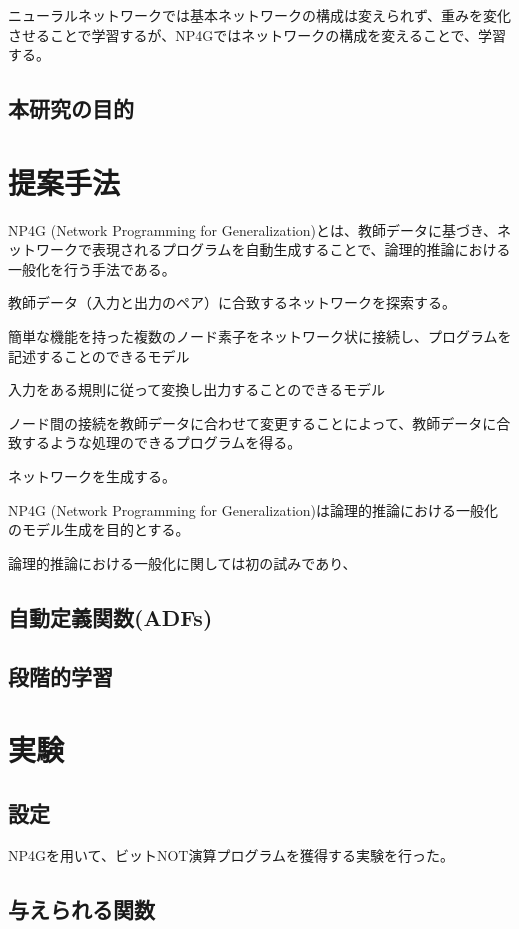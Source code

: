 \documentclass[exploratorypaper]{jsaiart} %
\begin{document}
ニューラルネットワークでは基本ネットワークの構成は変えられず、重みを変化させることで学習するが、NP4Gではネットワークの構成を変えることで、学習する。
\subsection{本研究の目的}


\section{提案手法}
NP4G (Network Programming for Generalization)とは、教師データに基づき、ネットワークで表現されるプログラムを自動生成することで、論理的推論における一般化を行う手法である。

教師データ（入力と出力のペア）に合致するネットワークを探索する。

簡単な機能を持った複数のノード素子をネットワーク状に接続し、プログラムを記述することのできるモデル

入力をある規則に従って変換し出力することのできるモデル

ノード間の接続を教師データに合わせて変更することによって、教師データに合致するような処理のできるプログラムを得る。

ネットワークを生成する。

NP4G (Network Programming for Generalization)は論理的推論における一般化のモデル生成を目的とする。

論理的推論における一般化に関しては初の試みであり、
\subsection{自動定義関数(ADFs)}

\subsection{段階的学習}

\section{実験}
\subsection{設定}
NP4Gを用いて、ビットNOT演算プログラムを獲得する実験を行った。

\subsection{与えられる関数}
\end{document}
